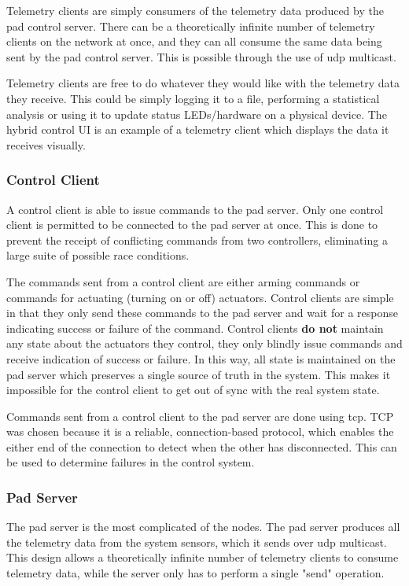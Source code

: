 Telemetry clients are simply consumers of the telemetry data produced by the pad control server. There can be a
theoretically infinite number of telemetry clients on the network at once, and they can all consume the same data being
sent by the pad control server. This is possible through the use of \gls{udp} multicast.

Telemetry clients are free to do whatever they would like with the telemetry data they receive. This could be simply
logging it to a file, performing a statistical analysis or using it to update status LEDs/hardware on a physical
device. The hybrid control UI is an example of a telemetry client which displays the data it receives visually.

\subsubsection{Control Client}

A control client is able to issue commands to the pad server. Only one control client is permitted to be connected to
the pad server at once. This is done to prevent the receipt of conflicting commands from two controllers, eliminating a
large suite of possible race conditions.

The commands sent from a control client are either arming commands or commands for actuating (turning on or off)
actuators. Control clients are simple in that they only send these commands to the pad server and wait for a response
indicating success or failure of the command. Control clients \textbf{do not} maintain any state about the actuators
they control, they only blindly issue commands and receive indication of success or failure. In this way, all state is
maintained on the pad server which preserves a single source of truth in the system. This makes it impossible for the
control client to get out of sync with the real system state.

Commands sent from a control client to the pad server are done using \gls{tcp}. \Gls{TCP} was chosen because it is a
reliable, connection-based protocol, which enables the either end of the connection to detect when the other has
disconnected. This can be used to determine failures in the control system.

\subsubsection{Pad Server}

The pad server is the most complicated of the nodes. The pad server produces all the telemetry data from the system
sensors, which it sends over \gls{udp} multicast. This design allows a theoretically infinite number of telemetry
clients to consume telemetry data, while the server only has to perform a single "send" operation.

